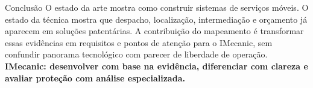 \documentclass[aspectratio=169,10pt]{beamer}
\begin{document}
\begin{frame}{Conclusão}
\Large O estado da arte mostra como construir sistemas de serviços móveis. O estado da técnica mostra que despacho, localização, intermediação e orçamento já aparecem em soluções patentárias.\vspace{.4cm}
\normalsize A contribuição do mapeamento é transformar essas evidências em requisitos e pontos de atenção para o IMecanic, sem confundir panorama tecnológico com parecer de liberdade de operação.\vspace{.4cm}
\centering\textbf{IMecanic: desenvolver com base na evidência, diferenciar com clareza e avaliar proteção com análise especializada.}
\end{frame}
\end{document}
